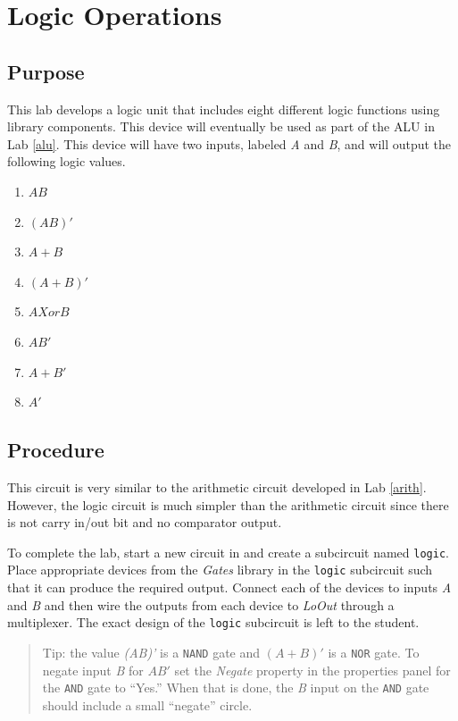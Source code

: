 \chapter{Logic Operations}\label{logic}

\section{Purpose}

This lab develops a logic unit that includes eight different logic functions using \LE library components. This device will eventually be used as part of the \acf{ALU} in Lab \ref{alu}. This device will have two inputs, labeled \textit{A} and \textit{B}, and will output the following logic values.

\begin{enumerate}
	\item $ AB $
	\item $ (AB)' $
	\item $ A+B $
	\item $ (A+B)' $
	\item $ A Xor B $
	\item $ AB' $
	\item $ A+B' $
	\item $ A' $
\end{enumerate}

\section{Procedure}

This circuit is very similar to the arithmetic circuit developed in Lab \ref{arith}. However, the logic circuit is much simpler than the arithmetic circuit since there is not carry in/out bit and no comparator output.

To complete the lab, start a new circuit in \LE and create a subcircuit named \lstinline[columns=fixed]|logic|. Place appropriate devices from the \textit{Gates} library in the \lstinline[columns=fixed]|logic| subcircuit such that it can produce the required output. Connect each of the devices to inputs \textit{A} and \textit{B} and then wire the outputs from each device to \textit{LoOut} through a multiplexer. The exact design of the \lstinline[columns=fixed]|logic| subcircuit is left to the student.

\begin{quotation}
	Tip: the value \textit{(AB)'} is a \texttt{NAND} gate and $ (A+B)' $ is a \texttt{NOR} gate. To negate input \textit{B} for $ AB' $ set the \textit{Negate} property in the properties panel for the \texttt{AND} gate to ``Yes.'' When that is done, the \textit{B} input on the \texttt{AND} gate should include a small ``negate'' circle.
\end{quotation}

